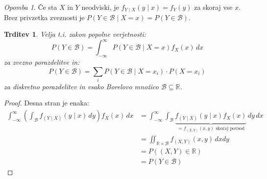 \documentclass[12pt]{book}
\theoremstyle{definition}
\theoremstyle{plain}
\theoremstyle{plain}
\newtheorem{trditev}{Trditev}
\theoremstyle{plain}
\theoremstyle{remark}
\newtheorem*{opomba}{Opomba}
\begin{document}
\begin{opomba}
    Če sta $X$ in $Y$ neodviski, je $f_{Y\mid X}(y \mid x)= f_Y(y)$ za skoraj vse $x$. Brez privzetka zveznosti je $P(Y \in \mathcal{B} \mid X=x)=P(Y \in \mathcal{B})$. 
\end{opomba}

\begin{trditev}
    Velja t.i. zakon popolne verjetnosti:
    $$
    P(Y \in \mathcal{B})=\int_{-\infty}^{\infty} P(Y \in \mathcal{B} \mid X=x) f_X(x) \, d x
    $$
    za zvezno porazdelitve in:
    $$
    P(Y \in \mathcal{B})=\sum_i P\left(Y \in \mathcal{B} \mid X=x_i\right) \cdot P\left(X=x_i\right)
    $$
    za diskretno porazdelitev in vsako Borelovo množico $\mathcal{B} \subseteq \mathbb{R}$.
\end{trditev}

\newpage 

\begin{proof}
    Desna stran je enaka: 
    $$
    \begin{aligned}
        \int_{-\infty}^{\infty}\left(\int_{\mathcal{B}} f_{(Y \mid X)}(y \mid x) \,d y\right) f_X(x) \, d x &=\int_{-\infty}^{\infty} \int_{\mathcal{B}} \underbrace{f_{(Y \mid X)}(y \mid x) f_X(x)}_{=f_{(X,Y)}(x,y) \text{ skoraj povsod}} \, d y \, d x \\
        &=\iint_{\mathbb{R} \times \mathcal{B}} f_{(X, Y)}(x, y) \, d x d y \\
        &=P((X, Y) \in \mathbb{R}) \\
        &= P(Y \in \mathcal{B})
    \end{aligned}
    $$
\end{proof}
\end{document}

